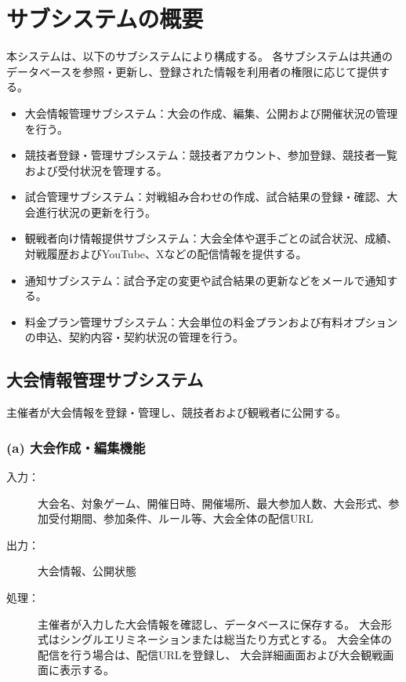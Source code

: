 \section{サブシステムの概要}

本システムは、以下のサブシステムにより構成する。
各サブシステムは共通のデータベースを参照・更新し、登録された情報を利用者の権限に応じて提供する。

\begin{itemize}
    \item 大会情報管理サブシステム：大会の作成、編集、公開および開催状況の管理を行う。
    \item 競技者登録・管理サブシステム：競技者アカウント、参加登録、競技者一覧および受付状況を管理する。
    \item 試合管理サブシステム：対戦組み合わせの作成、試合結果の登録・確認、大会進行状況の更新を行う。
    \item 観戦者向け情報提供サブシステム：大会全体や選手ごとの試合状況、成績、対戦履歴およびYouTube、Xなどの配信情報を提供する。
    \item 通知サブシステム：試合予定の変更や試合結果の更新などをメールで通知する。
    \item 料金プラン管理サブシステム：大会単位の料金プランおよび有料オプションの申込、契約内容・契約状況の管理を行う。
\end{itemize}

\subsection{大会情報管理サブシステム}
主催者が大会情報を登録・管理し、競技者および観戦者に公開する。

\subsubsection*{(a) 大会作成・編集機能}
\begin{description}
    \item[入力：]大会名、対象ゲーム、開催日時、開催場所、最大参加人数、大会形式、参加受付期間、参加条件、ルール等、大会全体の配信URL
    \item[出力：]大会情報、公開状態
    \item[処理：]主催者が入力した大会情報を確認し、データベースに保存する。
                大会形式はシングルエリミネーションまたは総当たり方式とする。
                大会全体の配信を行う場合は、配信URLを登録し、
                大会詳細画面および大会観戦画面に表示する。
\end{description}

